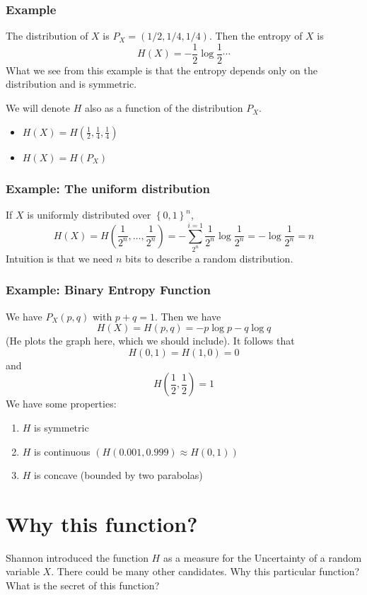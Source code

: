 \documentclass{article}
\begin{document}
\subsubsection{Example}

The distribution of $X$ is $P_X=\left(1/2, 1/4, 1/4\right)$. Then the entropy of $X$ is 
\[
H(X) = -\frac{1}{2}\log \frac{1}{2} \cdots
\]
What we see from this example is that the entropy depends only on the distribution and is symmetric.

We will denote $H$ also as a function of the distribution $P_X$.
\begin{itemize}
    \item $H(X)=H(\frac{1}{2},\frac{1}{4},\frac{1}{4})$
    \item $H(X) = H(P_X)$
\end{itemize}

\subsubsection{Example: The uniform distribution}

If $X$ is uniformly distributed over $\left\{0,1\right\}^n$,
\[
H(X) = H\left(\frac{1}{2^n},\ldots,\frac{1}{2^n}\right)=-\sum_{2^n}^{i=1}\frac{1}{2^n}\log \frac{1}{2^n}=-\log\frac{1}{2^n}=n
\]
Intuition is that we need $n$ bits to describe a random distribution.

\subsubsection{Example: Binary Entropy Function}

We have $P_X(p,q)$ with $p+q=1$. Then we have 
\[
H(X) = H(p,q)=-p\log p - q\log q
\]
(He plots the graph here, which we should include). It follows that 
\[
H(0,1)=H(1,0)=0
\]
and 
\[
H\left(\frac{1}{2},\frac{1}{2}\right)=1
\]
We have some properties:
\begin{enumerate}
    \item $H$ is symmetric
    \item $H$ is continuous $\left(H(0.001,0.999)\approx H(0,1)\right)$
    \item $H$ is concave (bounded by two parabolas)
\end{enumerate}

\section{Why this function?}

Shannon introduced the function $H$ as a measure for the Uncertainty of a random variable $X$. There could be many other candidates. Why this particular function? What is the secret of this function?
\end{document}
